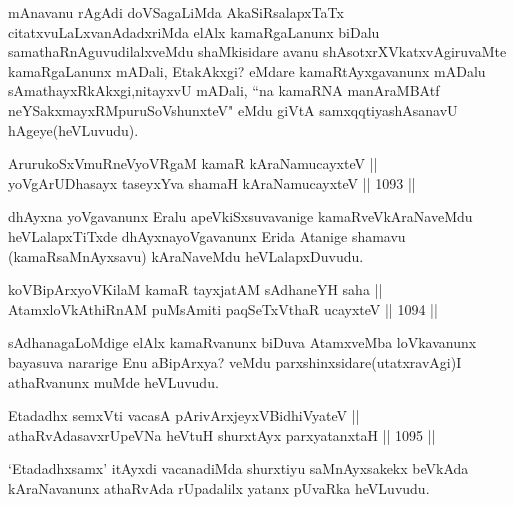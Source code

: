 \begin{artha}
mAnavanu rAgAdi doVSagaLiMda AkaSiRsalapxTaTx citatxvuLaLxvanAdadxriMda elAlx kamaRgaLanunx biDalu samathaRnAguvudilalxveMdu shaMkisidare avanu shAsotxrXVkatxvAgiruvaMte kamaRgaLanunx mADali, EtakAkxgi? eMdare kamaRtAyxgavanunx mADalu sAmathayxRkAkxgi,\break nitayxvU mADali, ``na kamaRNA manAraMBAtf neYSakxmayxRM\break puruSoV\s shunxteV" eMdu giVtA samxqqtiyashAsanavU hAgeye\break (heVLuvudu).
\end{artha}

\begin{shl}
ArurukoSxVmuRneVyoVRgaM kamaR kAraNamucayxteV || \\
yoVgArUDhasayx taseyxYva shamaH kAraNamucayxteV \hfill || 1093 ||  
\end{shl}

\begin{artha}
dhAyxna yoVgavanunx Eralu apeVkiSxsuvavanige kamaRveVkAraNaveMdu heVLalapxTiTxde dhAyxnayoVgavanunx Erida Atanige shamavu (kamaRsaMnAyxsavu) kAraNaveMdu heVLalapxDuvudu.
\end{artha}


\begin{shl}
koV\s BipArxyoV\s KilaM kamaR tayxjatAM sAdhaneYH saha || \\
AtamxloVkAthiRnAM puMsAmiti paqSeTxV\s thaR ucayxteV \hfill || 1094 ||
\end{shl}

\begin{artha}
sAdhanagaLoMdige elAlx kamaRvanunx biDuva AtamxveMba loVkavanunx bayasuva nararige Enu aBipArxya? veMdu parxshinxsidare\break (utatxravAgi)I athaRvanunx muMde heVLuvudu.
\end{artha}

\begin{shl}
Etadadhx semxVti vacasA pArivArxjeyxV\s BidhiVyateV || \\
athaRvAdasavxrUpeVNa heVtuH shurxtAyx parxyatanxtaH \hfill || 1095 ||  
\end{shl}

\begin{artha}
`Etadadhxsamx' itAyxdi vacanadiMda shurxtiyu saMnAyxsakekx beVkAda kAraNavanunx athaRvAda rUpadalilx yatanx pUvaRka heVLuvudu.
\end{artha}

